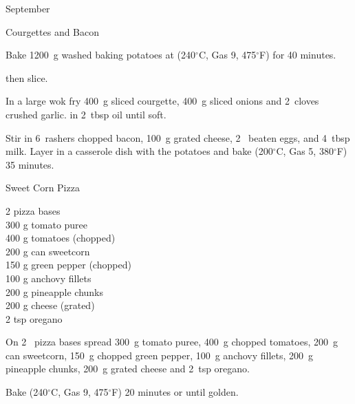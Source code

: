 \begin{menu}{September}
\begin{recipe}{2}{Courgettes and Bacon}
\begin{ingredients}
		\end{ingredients}
	
    \begin{instructions}
    \item 
      Bake 1200~g washed baking potatoes
      at
      (240$^{\circ}$C, Gas 9, 475$^{\circ}$F) for 40 minutes.
    
        then slice.
      \item 
        In a large wok fry
        400~g sliced courgette,
        400~g sliced onions
        and
        2~cloves crushed garlic.
        in
        2~tbsp  oil
        until soft.
      \item 
        Stir in
        6~rashers chopped bacon,
        100~g grated cheese,
        2~ beaten eggs,
        and
        4~tbsp  milk.
        Layer in a casserole dish
        with the potatoes
        and bake (200$^{\circ}$C, Gas 5, 380$^{\circ}$F) 35 minutes.
      
    \end{instructions}
    \end{recipe}%
  
    \begin{recipe}{2}{Sweet Corn Pizza}%
		\begin{ingredients}
		2  pizza bases  \\
	300 g tomato puree  \\
	400 g tomatoes (chopped) \\
	200 g can sweetcorn  \\
	150 g green pepper (chopped) \\
	100 g anchovy fillets  \\
	200 g pineapple chunks  \\
	200 g cheese (grated) \\
	2 tsp oregano  \\
	
		\end{ingredients}
	
	
    \begin{instructions}
    \item 
        On
        2~  pizza bases
        spread
        300~g  tomato puree,
        400~g chopped tomatoes,
        200~g  can sweetcorn,
        150~g chopped green pepper,
        100~g  anchovy fillets,
        200~g  pineapple chunks,
        200~g grated cheese
        and
        2~tsp  oregano.
      \item 
        Bake (240$^{\circ}$C, Gas 9, 475$^{\circ}$F) 20 minutes or until golden.
      

\end{instructions}
\end{recipe}
\end{menu}
